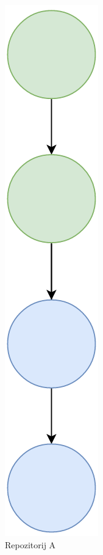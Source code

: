 \documentclass[times, utf8, diplomski, numeric]{fer}
\begin{document}
\begin{figure}[b!]
\begin{subfigure}{.24\textwidth}
\includegraphics[scale=0.4]{VersioningTreeB}
\caption{Repozitorij A}
\label{fig:VersioningTreeB}
\end{subfigure}
\begin{subfigure}{.24\textwidth}
\centering

\end{subfigure}
\end{figure}
\end{document}
